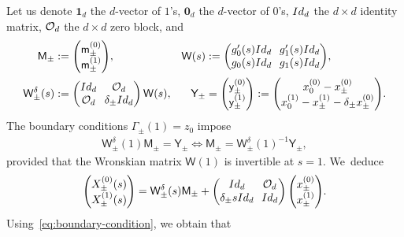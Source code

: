 \documentclass[10pt]{amsart}
\theoremstyle{definition}
\newcommand{\sW}{{\mathsf W}}
\newcommand{\I}{\textup{Id}}\let\Id\I
\newcommand{\U}{\mathbf{1}}
\newcommand{\V}{\mathbf{0}}
\begin{document}
Let us denote $\U_d$ the $d$-vector of $1$'s, $\V_d$ the
$d$-vector of $0$'s, $\I_d$ the $d\times d$ identity matrix,
${\mathcal O}_d$ the $d\times d$ zero block, and
\begin{align*}
\mathsf M_\pm &:=\arraycolsep3.5pt
\begin{pmatrix}
\mathsf m^{(0)}_\pm \\
\mathsf m^{(1)} _\pm
\end{pmatrix}\!, &
\sW(s) &:=\arraycolsep3.5pt
\begin{pmatrix}
g_0'(s) \I_d & g_1 '(s) \I_d \\
g_0(s) \I_d & g_1(s) \I_d
\end{pmatrix}\!, \\
\sW_\pm ^\delta (s) &:=\arraycolsep3.5pt
\begin{pmatrix}
\I_d & \OO_d \\
\OO_d & \delta_\pm \I_d
\end{pmatrix} \sW(s), &
\mathsf Y_\pm &=\arraycolsep3.5pt
\begin{pmatrix}
\mathsf y^{(0)} _\pm \\
\mathsf y^{(1)} _\pm
\end{pmatrix}
:=
\begin{pmatrix}
x^{(0)}_0 - x^{(0)}_\pm \\
x^{(1)}_0 - x^{(1)}_\pm - \delta_\pm x^{(0)}_\pm
\end{pmatrix}\!.
\end{align*}
The boundary conditions $\Gamma_\pm(1)=z_0$ impose
\begin{align}\label{eq:boundary-condition}
\sW_\pm ^\delta(1) \mathsf M_\pm = \mathsf Y_\pm \iff
\mathsf M_\pm = \sW_\pm ^\delta(1)^{-1} \mathsf Y_\pm,
\end{align}
provided that the Wronskian matrix $\sW(1)$ is invertible at
$s=1$. We~deduce
\begin{align*}\arraycolsep3.5pt
\begin{pmatrix}
X^{(0)}_\pm (s) \\
X^{(1)}_\pm (s)
\end{pmatrix}
= \sW_\pm ^\delta(s) \mathsf M_\pm +
\begin{pmatrix}
\I_d & \OO_d \\
\delta_\pm s \I_d & \I_d
\end{pmatrix}
\begin{pmatrix}
x_\pm^{(0)}\\
x_\pm^{(1)}
\end{pmatrix}\!.
\end{align*}
Using~\eqref{eq:boundary-condition}, we obtain that
\end{document}

